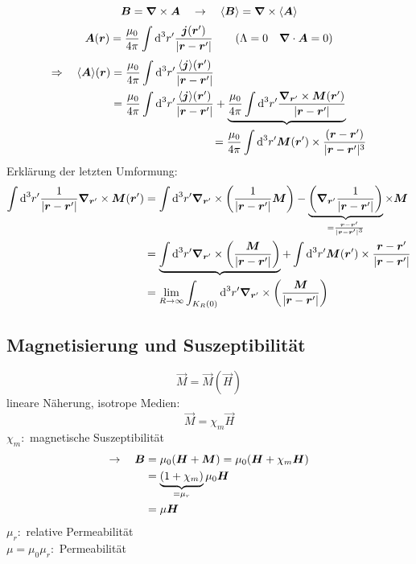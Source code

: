 \begin{equation*}
\bm{B} = \bm{\nabla} \times \bm{A} \quad \rightarrow \quad \langle \bm{B} \rangle = \bm{\nabla} \times \langle \bm{A} \rangle
\end{equation*}
\begin{equation*}
\bm{A} (\bm{r}) = \frac{\mu_0}{4 \pi} \int \textrm{d} ^3 r' \frac{\bm{j}(\bm{r}')}{|\bm{r} - \bm{r}'|} \qquad (\Lambda = 0 \quad \bm{\nabla} \cdot \bm{A} = 0)
\end{equation*}
\begin{align*}
\Rightarrow \quad \langle \bm{A} \rangle (\bm{r}) &= \frac{\mu_0}{4 \pi} \int \textrm{d}^3r' \frac{\langle \bm{j} \rangle (\bm{r}')}{|\bm{r} - \bm{r}'|}\\
&= \frac{\mu_0}{4 \pi} \int \textrm{d}^3 r' \frac{\langle \bm{j} \rangle (\bm{r}')}{|\bm{r} - \bm{r}'|} + \underbrace{\frac{\mu_0}{4 \pi} \int\textrm{d}^3 r ' \frac{\bm{\nabla}_{\bm{r}'} \times \bm{M} (\bm{r}')}{|\bm{r} - \bm{r}'|}}\\
& \qquad \qquad \qquad \qquad \quad = \frac{\mu_0}{4 \pi} \int \textrm{d}^3 r' \bm{M}(\bm{r}') \times \frac{(\bm{r} - \bm{r}')}{|\bm{r} - \bm{r}'|^3}
\end{align*}
Erklärung der letzten Umformung:
\begin{align*}
\int \textrm{d}^3 r' \frac{1}{|\bm{r} - \bm{r}'|} \bm{\nabla}_{\bm{r}'} \times \bm{M} (\bm{r}') &= \int \textrm{d}^3 r' \bm{\nabla}_{\bm{r}'} \times \left(\frac{1}{|\bm{r} - \bm{r}'|} \bm{M}\right) - \underbrace{\left(\bm{\nabla}_{\bm{r}'} \frac{1}{|\bm{r} - \bm{r}'|}\right)}_{= \frac{\bm{r} - \bm{r}'}{|\bm{r} - \bm{r}'|^3}} \times \bm{M}\\
&= \underbrace{\int\textrm{d}^3 r' \bm{\nabla}_{\bm{r}'} \times \left(\frac{\bm{M}}{|\bm{r} - \bm{r}'|}\right)} + \int\textrm{d}^3r' \bm{M}(\bm{r}')  \times \frac{\bm{r} - \bm{r}'}{|\bm{r} - \bm{r}'|}\\
&= \lim\limits_{R \to \infty} \int_{K_R(0)} \textrm{d}^3 r' \bm{\nabla}_{\bm{r}'} \times \left(\frac{\bm{M}}{|\bm{r} - \bm{r}'|}\right)
\end{align*}
%
%
%
%
%
%

\subsection{Magnetisierung und Suszeptibilität}

\begin{equation*}
\vec{M} = \vec{M}(\vec{H})
\end{equation*}
lineare Näherung, isotrope Medien:
\begin{equation*}
\vec{M} = \chi_m \vec{H}
\end{equation*}
$ \chi_m : $ magnetische Suszeptibilität
\begin{align*}
\rightarrow \quad \bm{B} &= \mu_0 (\bm{H} + \bm{M}) = \mu_0 (\bm{H} + \chi_m \bm{H})\\
&= \underbrace{(1 + \chi_m)}_{= \mu_r} \mu_0 \bm{H}\\
&= \mu \bm{H}
\end{align*}
$ \mu_r : $ relative Permeabilität\\
$ \mu = \mu_0 \mu_r : $ Permeabilität